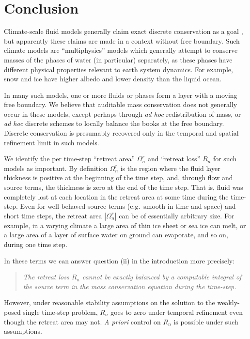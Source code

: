 \documentclass[final,leqno,onefignum,onetabnum]{siamltex1213bueler}
\begin{document}
\section{Conclusion} \label{sec:conclusion}

Climate-scale fluid models generally claim exact discrete conservation as a goal \cite{Thuburn2008}, but apparently these claims are made in a context without free boundary.  Such climate models are ``multiphysics'' models which generally attempt to conserve masses of the phases of water (in particular) separately, as these phases have different physical properties relevant to earth system dynamics.  For example, snow and ice have higher albedo and lower density than the liquid ocean.

In many such models, one or more fluids or phases form a layer with a moving free boundary.  We believe that auditable mass conservation does not generally occur in these models, except perhaps through \emph{ad hoc} redistribution of mass, or \emph{ad hoc} discrete schemes to locally balance the books at the free boundary.  Discrete conservation is presumably recovered only in the temporal and spatial refinement limit in such models.

We identify the per time-step ``retreat area'' $\Omega_n^r$ and ``retreat loss'' $R_n$ for such models as important.  By definition $\Omega_n^r$ is the region where the fluid layer thickness is positive at the beginning of the time step, and, through flow and source terms, the thickness is zero at the end of the time step.  That is, fluid was completely lost at each location in the retreat area at some time during the time-step.  Even for well-behaved source terms (e.g.~smooth in time and space) and short time steps, the retreat area $|\Omega_n^r|$ can be of essentially arbitrary size.  For example, in a varying climate a large area of thin ice sheet or sea ice can melt, or a large area of a layer of surface water on ground can evaporate, and so on, during one time step.

In these terms we can answer question (ii) in the introduction more precisely:
\begin{quote}
  \emph{The retreat loss $R_n$ cannot be exactly balanced by a computable integral of the source term in the mass conservation equation during the time-step.}
\end{quote}
However, under reasonable stability assumptions on the solution to the weakly-posed single time-step problem,  $R_n$ goes to zero under temporal refinement even though the retreat area may not.  \emph{A priori} control on $R_n$ is possible under such assumptions.
\end{document}
